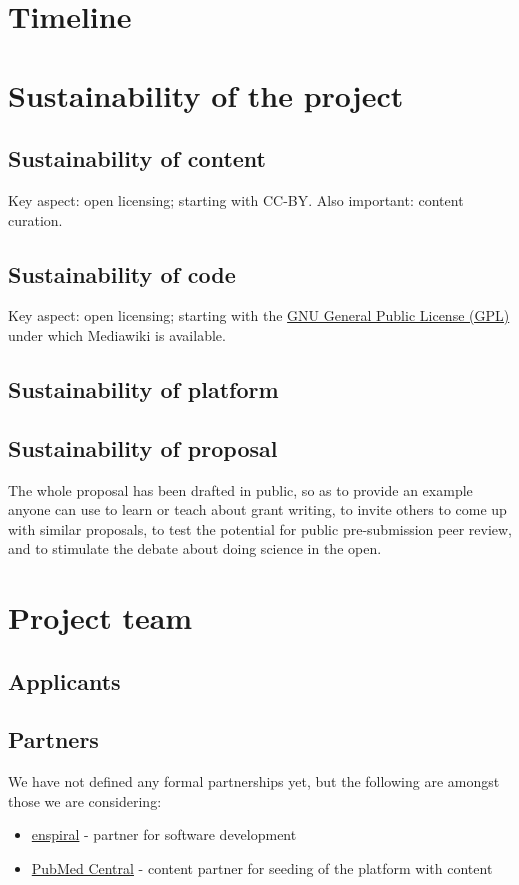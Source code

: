 \documentclass[final,authoryear,3p]{elsarticle-open-drafting}
\begin{document}
\section{Timeline}

\section{Sustainability of the project}
\subsection{Sustainability of content}
Key aspect: open licensing; starting with CC-BY.
Also important: content curation.

\subsection{Sustainability of code}
Key aspect: open licensing; starting with the \href{http://www.gnu.org/licenses/gpl.html}{GNU General Public License (GPL)} under which Mediawiki is available.

\subsection{Sustainability of platform}
\subsection{Sustainability of proposal}
The whole proposal has been drafted in public, so as to provide an example anyone can use 
to learn or teach about grant writing, to invite others to come up with similar proposals, to test the potential for public pre-submission peer review, and to stimulate the debate about doing science in the open.

\section{Project team}
\subsection{Applicants}
\subsection{Partners}
We have not defined any formal partnerships yet, but the following are amongst those we are considering:
\begin{itemize}
	\item \href{http://www.enspiral.com}{enspiral} - partner for software development
	\item \href{http://www.ncbi.nlm.nih.gov/pmc/}{PubMed Central} - content partner for seeding of the platform with content
	
\end{itemize}
\end{document}

